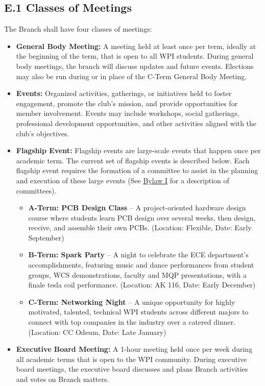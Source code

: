 \documentclass[11pt,a4paper]{article}
\begin{document}
\subsection*{E.1 Classes of Meetings}
\label{E.1}
The Branch shall have four classes of meetings:
\begin{itemize}[noitemsep]
    \item \textbf{General Body Meeting:} A meeting held at least once per term, ideally at the beginning of the term, that is open to all WPI students. During general body meetings, the branch will discuss updates and future events. Elections may also be run during or in place of the C-Term General Body Meeting.
    \item \textbf{Events:} Organized activities, gatherings, or initiatives held to foster engagement, promote the club's mission, and provide opportunities for member involvement. Events may include workshops, social gatherings, professional development opportunities, and other activities aligned with the club's objectives.
    \item \textbf{Flagship Event:}
    Flagship events are large-scale events that happen once per academic term. The current set of flagship events is described below. Each flagship event requires the formation of a committee to assist in the planning and execution of these large events (See \hyperref[I]{Bylaw I} for a description of committees).
    \begin{itemize}[noitemsep]
        \item \textbf{A-Term: PCB Design Class} -- A project-oriented hardware design course where students learn PCB design over several weeks, then design, receive, and assemble their own PCBs. (Location: Flexible, Date: Early September)
        \item \textbf{B-Term: Spark Party} -- A night to celebrate the ECE department's accomplishments, featuring music and dance performances from student groups, WCS demonstrations, faculty and MQP presentations, with a finale tesla coil performance. (Location: AK 116, Date: Early December)
        \item \textbf{C-Term: Networking Night} -- A unique opportunity for highly motivated, talented, technical WPI students across different majors to connect with top companies in the industry over a catered dinner. (Location: CC Odeum, Date: Late January)
    \end{itemize}
    \item \textbf{Executive Board Meeting:} A 1-hour meeting held once per week during all academic terms that is open to the WPI community. During executive board meetings, the executive board discusses and plans Branch activities and votes on Branch matters.
\end{itemize}
\end{document}

